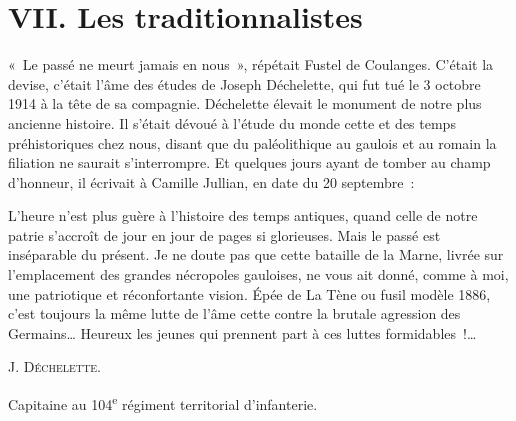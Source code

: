 \documentclass[french,twoside]{book} %
\newcommand\surname[1]{\textsc{#1}}
\newenvironment{quoteblock}%
  {\begin{quoting}}
  {\end{quoting}}
\newcommand\chapteropen{} %
\newcommand\chaptercont{} %
\newenvironment{quotebar}{%
    \def\FrameCommand{{\color{rubric!10!}\vrule width 0.5em} \hspace{0.9em}}%
    \def\OuterFrameSep{\itemsep} %
    \MakeFramed {\advance\hsize-\width \FrameRestore}
  }%
  {%
    \endMakeFramed
  }
\renewenvironment{quoteblock}%
  {%
    \savenotes
    \setstretch{0.9}
    \normalfont
    \begin{quotebar}
  }
  {%
    \end{quotebar}
    \spewnotes
  }
\begin{document}
\chapteropen
\chapter[{VII. Les traditionnalistes}]{VII. Les traditionnalistes}\renewcommand{\leftmark}{VII. Les traditionnalistes}


\chaptercont
\noindent « Le passé ne meurt jamais en nous », répétait Fustel de Coulanges. C’était la devise, c’était l’âme des études de Joseph Déchelette, qui fut tué le 3 octobre 1914 à la tête de sa compagnie. Déchelette élevait le monument de notre plus ancienne histoire. Il s’était dévoué à l’étude du monde cette et des temps préhistoriques chez nous, disant que du paléolithique au gaulois et au romain la filiation ne saurait s’interrompre. Et quelques jours ayant de tomber au champ d’honneur, il écrivait à Camille Jullian, en date du 20 septembre :‌\par

\begin{quoteblock}
 \noindent L’heure n’est plus guère à l’histoire des temps antiques, quand celle de notre patrie s’accroît de jour en jour de pages si glorieuses. Mais le passé est inséparable du présent. Je ne doute pas que cette bataille de la Marne, livrée sur l’emplacement des grandes nécropoles gauloises, ne vous ait donné, comme à moi, une patriotique et réconfortante vision. Épée de La Tène ou fusil modèle 1886, c’est toujours la même lutte de l’âme cette contre la brutale agression des Germains… Heureux les jeunes qui prennent part à ces luttes formidables !…‌\par
 \surname{J. Déchelette.}‌\par
 Capitaine au 104\textsuperscript{e} régiment territorial d’infanterie.‌
 \end{quoteblock}
\end{document}
